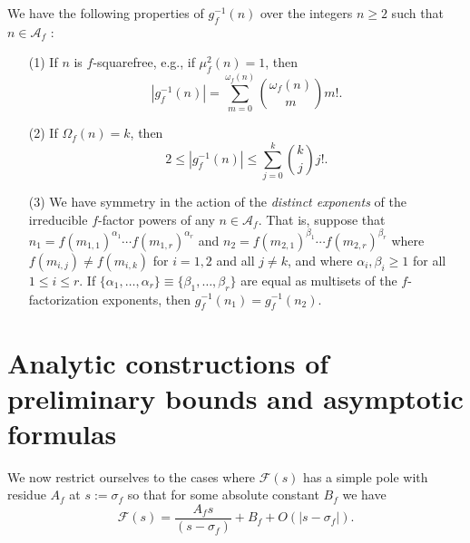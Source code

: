 \documentclass[11pt,reqno,a4letter]{article}
\numberwithin{figure}{section}
\numberwithin{table}{section}
\newcommand{\cf}{\textit{cf.\ }}
\theoremstyle{plain}
\numberwithin{theorem}{section}
\theoremstyle{definition}
\begin{document}
We have the following properties of $g_f^{-1}(n)$ over the integers $n \geq 2$ such that 
$n \in \mathcal{A}_f$ \cite[\cf \S TODO]{SCHMIDT-MERTENS-2021}: 
\begin{itemize}
\item[(1)] If $n$ is $f$-squarefree, e.g., if $\mu_f^2(n) = 1$, then 
     \[
     |g_f^{-1}(n)| = \sum_{m=0}^{\omega_f(n)} \binom{\omega_f(n)}{m} m!. 
     \]
\item[(2)] If $\Omega_f(n) = k$, then 
     \[
     2 \leq |g_f^{-1}(n)| \leq \sum_{j=0}^{k} \binom{k}{j} j!. 
     \]
\item[(3)] We have symmetry in the action of the \emph{distinct exponents} of the 
     irreducible $f$-factor powers of any $n \in \mathcal{A}_f$. That is, suppose that 
     $n_1 = f(m_{1,1})^{\alpha_1} \cdots f(m_{1,r})^{\alpha_r}$ and 
     $n_2 = f(m_{2,1})^{\beta_1} \cdots f(m_{2,r})^{\beta_r}$ where 
     $f(m_{i,j}) \neq f(m_{i,k})$ for $i = 1,2$ and all $j \neq k$, and where 
     $\alpha_i,\beta_i \geq 1$ for all $1 \leq i \leq r$. 
     If $\{\alpha_1,\ldots,\alpha_r\} \equiv \{\beta_1,\ldots,\beta_r\}$ are equal as 
     multisets of the $f$-factorization exponents, then 
     $g_f^{-1}(n_1) = g_f^{-1}(n_2)$. 
\end{itemize} 

\newpage
\section{Analytic constructions of preliminary bounds and asymptotic formulas}

We now restrict ourselves to the cases where $\mathcal{F}(s)$ has a simple pole 
with residue $A_f$ at $s := \sigma_f$ so that for some absolute constant $B_f$ we have 
\[
\mathcal{F}(s) = \frac{A_f s}{(s-\sigma_f)} + B_f + O\left(|s-\sigma_f|\right). 
\]
\end{document}
